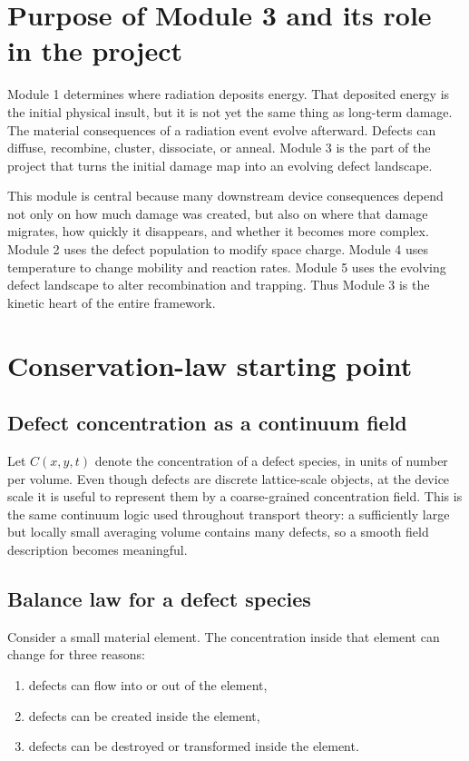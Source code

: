 \documentclass[11pt]{article}
\begin{document}
\section{Purpose of Module 3 and its role in the project}

Module 1 determines where radiation deposits energy. That deposited energy is the initial physical insult, but it is not yet the same thing as long-term damage. The material consequences of a radiation event evolve afterward. Defects can diffuse, recombine, cluster, dissociate, or anneal. Module 3 is the part of the project that turns the initial damage map into an evolving defect landscape.

This module is central because many downstream device consequences depend not only on how much damage was created, but also on where that damage migrates, how quickly it disappears, and whether it becomes more complex. Module 2 uses the defect population to modify space charge. Module 4 uses temperature to change mobility and reaction rates. Module 5 uses the evolving defect landscape to alter recombination and trapping. Thus Module 3 is the kinetic heart of the entire framework.

\section{Conservation-law starting point}

\subsection{Defect concentration as a continuum field}

Let $C(x,y,t)$ denote the concentration of a defect species, in units of number per volume. Even though defects are discrete lattice-scale objects, at the device scale it is useful to represent them by a coarse-grained concentration field. This is the same continuum logic used throughout transport theory: a sufficiently large but locally small averaging volume contains many defects, so a smooth field description becomes meaningful.

\subsection{Balance law for a defect species}

Consider a small material element. The concentration inside that element can change for three reasons:
\begin{enumerate}[label=\arabic*.]
    \item defects can flow into or out of the element,
    \item defects can be created inside the element,
    \item defects can be destroyed or transformed inside the element.
\end{enumerate}
\end{document}
